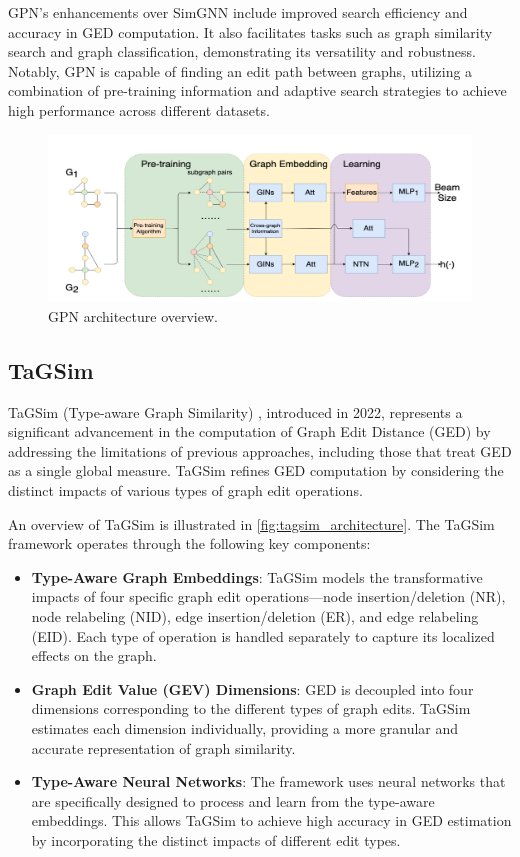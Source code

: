 \documentclass[../Thesis.tex]{subfiles}
\begin{document}
	GPN’s enhancements over SimGNN include improved search efficiency and accuracy in GED computation. It also facilitates tasks such as graph similarity search and graph classification, demonstrating its versatility and robustness. Notably, GPN is capable of finding an edit path between graphs, utilizing a combination of pre-training information and adaptive search strategies to achieve high performance across different datasets.
	
	\begin{figure}[H]
		\centering
		\includegraphics[width=\textwidth]{Images/gpn_architecture.png}
		\caption{GPN architecture overview.}
		\label{fig:gpn_architecture}
	\end{figure}
	
	
	\subsection{TaGSim}
	
	TaGSim (Type-aware Graph Similarity) \cite{TaGSim_type_aware_graph_similarity_learning_and_computation}, introduced in 2022, represents a significant advancement in the computation of Graph Edit Distance (GED) by addressing the limitations of previous approaches, including those that treat GED as a single global measure. TaGSim refines GED computation by considering the distinct impacts of various types of graph edit operations.
	
	An overview of TaGSim is illustrated in \autoref{fig:tagsim_architecture}. The TaGSim framework operates through the following key components:
	
	\begin{itemize}
		\item \textbf{Type-Aware Graph Embeddings}: TaGSim models the transformative impacts of four specific graph edit operations—node insertion/deletion (NR), node relabeling (NID), edge insertion/deletion (ER), and edge relabeling (EID). Each type of operation is handled separately to capture its localized effects on the graph.
		\item \textbf{Graph Edit Value (GEV) Dimensions}: GED is decoupled into four dimensions corresponding to the different types of graph edits. TaGSim estimates each dimension individually, providing a more granular and accurate representation of graph similarity.
		\item \textbf{Type-Aware Neural Networks}: The framework uses neural networks that are specifically designed to process and learn from the type-aware embeddings. This allows TaGSim to achieve high accuracy in GED estimation by incorporating the distinct impacts of different edit types.
	\end{itemize}
	
\end{document}
